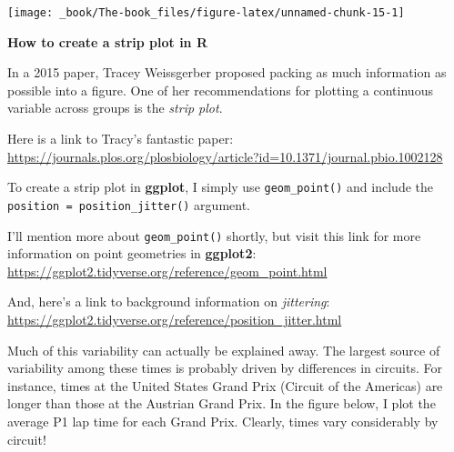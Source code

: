 \documentclass[
]{book}
\begin{document}
\begin{center}\texttt{[image: \_book/The-book\_files/figure-latex/unnamed-chunk-15-1]} \end{center}

\begin{blackbox}

\begin{center}
\textbf{How to create a strip plot in R}

\end{center}

In a 2015 paper, Tracey Weissgerber proposed packing as much information as possible into a figure. One of her recommendations for plotting a continuous variable across groups is the \emph{strip plot}.

Here is a link to Tracy's fantastic paper: \url{https://journals.plos.org/plosbiology/article?id=10.1371/journal.pbio.1002128}

To create a strip plot in \textbf{ggplot}, I simply use \texttt{geom\_point()} and include the \texttt{position\ =\ position\_jitter()} argument.

I'll mention more about \texttt{geom\_point()} shortly, but visit this link for more information on point geometries in \textbf{ggplot2}: \url{https://ggplot2.tidyverse.org/reference/geom_point.html}

And, here's a link to background information on \emph{jittering}: \url{https://ggplot2.tidyverse.org/reference/position_jitter.html}

\end{blackbox}

Much of this variability can actually be explained away. The largest source of variability among these times is probably driven by differences in circuits. For instance, times at the United States Grand Prix (Circuit of the Americas) are longer than those at the Austrian Grand Prix. In the figure below, I plot the average P1 lap time for each Grand Prix. Clearly, times vary considerably by circuit!
\end{document}
